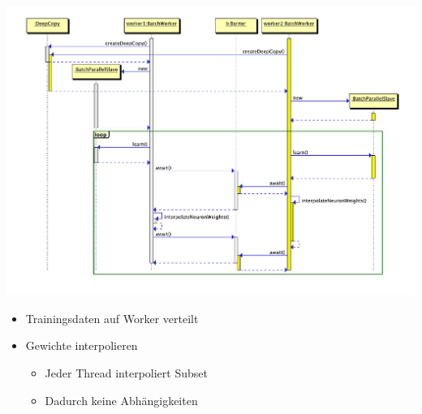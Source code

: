 \documentclass[18pt]{beamer}
\begin{document}
\begin{frame}[c,allowframebreaks]
	\framebreak
		\begin{center}
			\includegraphics[scale=0.33]{Grafiken/Batch_seq.pdf}
		\end{center}

	\framebreak

		\begin{itemize}
			\item Trainingsdaten auf Worker verteilt
			\item Gewichte interpolieren
			\begin{itemize}
				\item Jeder Thread interpoliert Subset
				\item Dadurch keine Abhängigkeiten
			\end{itemize}
		\end{itemize}
	\end{frame}
	
\end{document}
